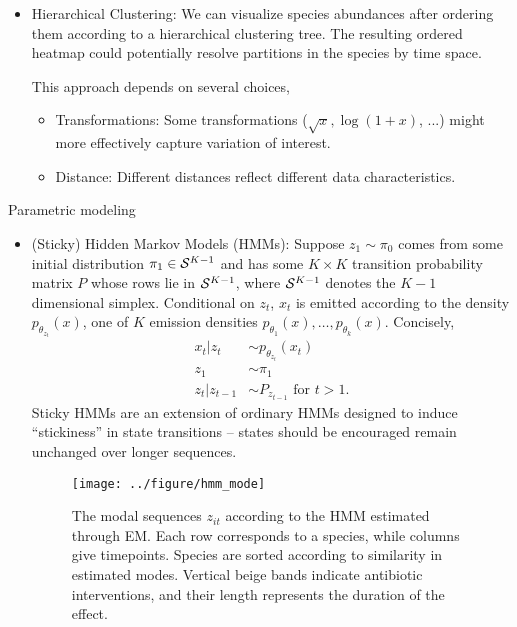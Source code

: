 \documentclass[final, 8pt]{beamer}
\newlength{\onecolwid}
\begin{document}
\begin{frame}
\begin{columns}
\begin{column}{\onecolwid}
  \begin{block}{}
\begin{itemize}
\item Hierarchical Clustering: We can visualize species abundances after
  ordering them according to a hierarchical clustering tree. The resulting
  ordered heatmap could potentially resolve partitions in the species by time
  space.

This approach depends on several choices,
\begin{itemize}
\item Transformations: Some transformations ($\sqrt{x}, \log\left(1 +
  x\right)$, ...) might more effectively capture variation of interest.
\item Distance: Different distances reflect different data characteristics.
\end{itemize}
\end{itemize}
\end{block}

\begin{block}{Parametric modeling}
\begin{itemize}
\item (Sticky) Hidden Markov Models (HMMs): Suppose $z_{1} \sim \pi_{0}$ comes
  from some initial distribution $\pi_{1} \in \mathcal{S}^{K - 1}$ and has some $K
  \times K$ transition probability matrix $P$ whose rows lie in $\mathcal{S}^{K -
    1}$, where $\mathcal{S}^{K - 1}$ denotes the $K - 1$ dimensional simplex.
  Conditional on $z_{t}$, $x_{t}$ is emitted according to the density
  $p_{\theta_{z_{t}}}\left(x\right)$, one of $K$ emission densities
  $p_{\theta_{1}}\left(x\right), \dots, p_{\theta_{k}}\left(x\right)$.
  Concisely,
\begin{align*}
  x_{t} \vert z_{t} &\sim p_{\theta_{z_{t}}}\left(x_{t}\right) \\
  z_{1} &\sim \pi_{1} \\
  z_{t} \vert z_{t - 1} &\sim P_{z_{t - 1}} \text{ for } t > 1.
\end{align*}
Sticky HMMs are an extension of ordinary HMMs designed to induce ``stickiness''
in state transitions -- states should be encouraged remain unchanged over longer
sequences.
\begin{figure}[ht]
  \centering
  \texttt{[image: ../figure/hmm\_mode]}
  \caption{The modal sequences $z_{it}$ according to the HMM estimated through
    EM. Each row corresponds to a species, while columns give timepoints.
    Species are sorted according to similarity in estimated modes. Vertical
    beige bands indicate antibiotic interventions, and their length represents
    the duration of the effect.\label{fig:hmm_mode} }
\end{figure}


\end{itemize}
\end{block}
\end{column}
\end{columns}
\end{frame}
\end{document}
